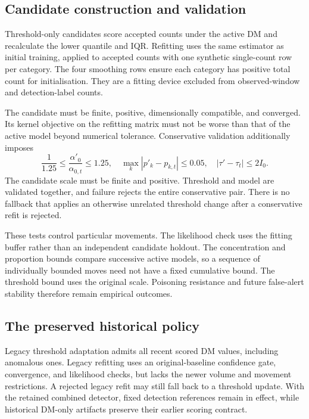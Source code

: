 \subsection{Candidate construction and validation}

Threshold-only candidates score accepted counts under the active DM and
recalculate the lower quantile and IQR. Refitting uses the same estimator
as initial training, applied to accepted counts with one synthetic
single-count row per category. The four smoothing rows ensure each
category has positive total count for initialisation. They are a fitting
device excluded from observed-window and detection-label counts.

The candidate must be finite, positive, dimensionally compatible, and
converged. Its kernel objective on the refitting matrix must not be worse
than that of the active model beyond numerical tolerance. Conservative
validation additionally imposes
\begin{equation}
 \frac{1}{1.25}\leq\frac{\alpha'_0}{\alpha_{0,t}}\leq1.25,
 \quad \max_k|p'_k-p_{k,t}|\leq0.05,
 \quad |\tau'-\tau_t|\leq2I_0.
\label{eq:movement-bounds}
\end{equation}
The candidate scale must be finite and positive. Threshold and model are
validated together, and failure rejects the entire conservative pair.
There is no fallback that applies an otherwise unrelated threshold change
after a conservative refit is rejected.

These tests control particular movements. The likelihood check uses the
fitting buffer rather than an independent candidate holdout. The
concentration and proportion bounds compare successive active models,
so a sequence of individually bounded moves need not have a fixed
cumulative bound. The threshold bound uses the original scale. Poisoning
resistance and future false-alert stability therefore remain empirical
outcomes.

\subsection{The preserved historical policy}

Legacy threshold adaptation admits all recent scored DM values, including
anomalous ones. Legacy refitting uses an original-baseline confidence
gate, convergence, and likelihood checks, but lacks the newer volume and
movement restrictions. A rejected legacy refit may still fall back to a
threshold update. With the retained combined detector, fixed detection
references remain in effect, while historical DM-only artifacts preserve
their earlier scoring contract.

